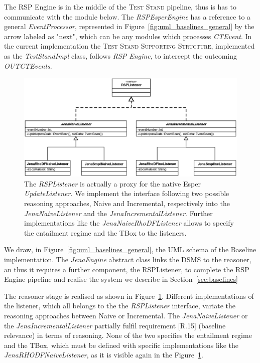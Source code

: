 The RSP Engine is in the middle of the \textsc{Test Stand} pipeline, thus is has to communicate with the module below. The \textit{RSPEsperEngine} has a reference to a general \textit{EventProcessor}, represented in Figure~\ref{fig:uml_baselines_general}  by the arrow labeled as "next", which can be any modules which processes \textit{CTEvent}. In the current implementation the \textsc{Test Stand Supporting Structure}, implemented as the \textit{TestStandImpl} class, follows \textit{RSP Engine}, to intercept the outcoming \textit{OUTCTEvents}.

\begin{figure}[tbh]
  \centering
	\includegraphics[width=\linewidth]{images/uml_baselines_listener}
	\caption[\textit{RSPListener} Implementations - UML Schema]{The \textit{RSPListener} is actually a proxy for the native Esper \textit{UpdateListener}. We implement the interface following two possible reasoning approaches, Naive and Incremental, respectively into the  \textit{JenaNaiveListener} and the \textit{JenaIncrementalListener}. Further implementations like the \textit{JenaNaiveRhoDFListener} allows to specify the entailment regime and the TBox to the listeners.} 
  	\label{fig:uml_baselines_listener}
\end{figure}

We draw, in Figure~\ref{fig:uml_baselines_general}, the UML schema of the Baseline implementation. The \textit{JenaEngine} abstract class links the DSMS to the reasoner, an thus it requires a further component, the RSPListener, to complete the RSP Engine pipeline and realise the system we describe in Section~\ref{sec:baselines}
 
The reasoner stage is realised as shown in Figure~\ref{fig:uml_baselines_listener}. Different implementations of the listener, which all belongs to the the \textit{RSPListener} interface, variate the reasoning approaches between Naive or Incremental. The \textit{JenaNaiveListener} or the \textit{JenaIncrementalListener} partially fulfil requirement [R.15] (baseline relevance) in terms of reasoning. None of the two specifies the entailment regime and the TBox, which must be defined with specific implementations like the \textit{JenaRHODFNaiveListener}, as it is visible again in the Figure~\ref{fig:uml_baselines_listener}.

